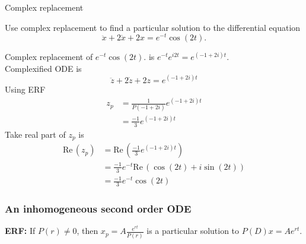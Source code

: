 \begin{problem}
  Complex replacement
\end{problem}
Use complex replacement to find a particular solution to the differential equation
\begin{equation*}
  \ddot x+2\dot x+2x=e^{-t}\cos (2t).
\end{equation*}

Complex replacement of $e^{-t}\cos (2t).$ is $ e^{-t} e^{i2t} = e^{(-1 + 2i)t}$.\\
Complexified ODE is
\begin{equation*}
  \ddot z+2\dot z+2z = e^{(-1 + 2i)t}
\end{equation*}
Using ERF
\begin{align*}
  z_ p &= \frac{1}{P(-1 + 2i)} e^{(-1 + 2i)t} \\
  &= \frac{-1}{3} e^{(-1 + 2i)t} 
\end{align*}
Take real part of $z_ p$ is
\begin{align*}
  \mathrm{Re\, }(z_ p) &= \mathrm{Re\, } \left( \frac{-1}{3} e^{(-1 + 2i)t}\right) \\
                       &= \frac{-1}{3} e^{-t} \mathrm{Re\, } \left( \cos (2t) + i \sin (2t) \right) \\
                       &= \frac{-1}{3} e^{-t} \cos (2t)
\end{align*}
\clearpage

\subsubsection{An inhomogeneous second order ODE}
\textbf{ERF: } If $P(r) \neq 0$, then $\displaystyle x_ p = A\frac{e^{rt}}{P(r)}$
is a particular solution to $P(D)x = Ae^{rt}$.

